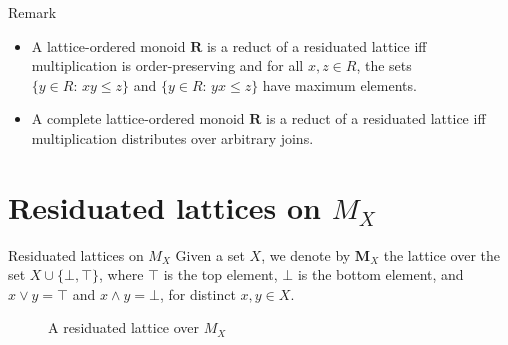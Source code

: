 \documentclass[professionalfont, handout, 10pt]{beamer} %
\theoremstyle{plain}
\theoremstyle{definition}
\begin{document}
\begin{frame}

\begin{block}{Remark}
    \begin{itemize}
        \item A lattice-ordered monoid $\mathbf{R}$ is a reduct of a residuated lattice iff multiplication is order-preserving and for all $x, z \in R$, the sets $\{y \in R: \, xy \leq z\}$ and $\{y \in R: \, yx \leq z\}$ have maximum elements.

        \item A complete lattice-ordered monoid $\mathbf{R}$ is a reduct of a residuated lattice iff multiplication distributes over arbitrary joins.
    \end{itemize}    
\end{block}

\end{frame}

\section{Residuated lattices on $M_X$}

\begin{frame}{Residuated lattices on $M_X$}
Given a set $X$, we denote by $\mathbf{M}_X$ the lattice over the set $X\cup \{\bot, \top\}$, where $\top$ is the top element, $\bot$ is the bottom element, and $x\vee y=\top$ and $x \wedge y=\bot$, for distinct $x,y \in X$.

\begin{figure}[h]
\centering
{}
\caption{A residuated lattice over $M_X$}
\end{figure}
\end{frame}
\end{document}
